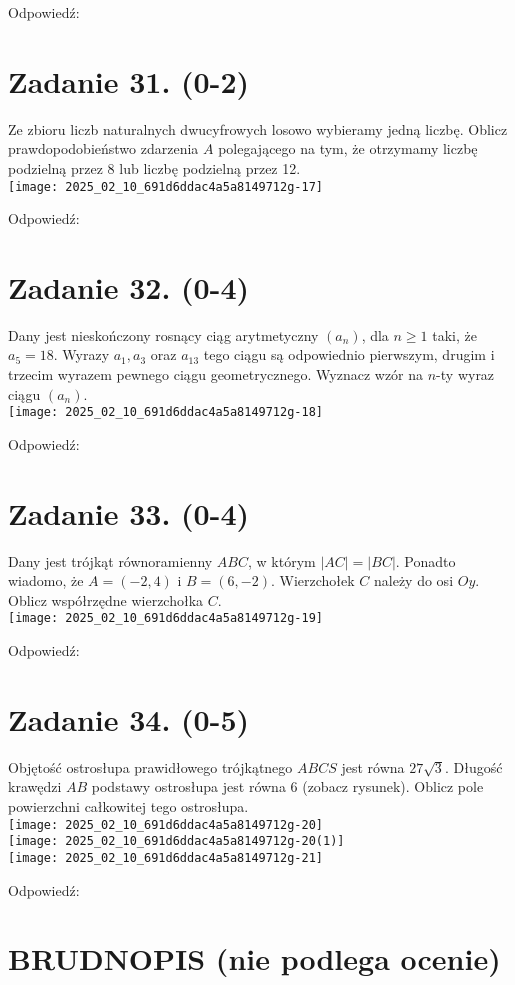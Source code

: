 \documentclass[10pt]{article}
\begin{document}
Odpowiedź:

\section*{Zadanie 31. (0-2)}
Ze zbioru liczb naturalnych dwucyfrowych losowo wybieramy jedną liczbę. Oblicz prawdopodobieństwo zdarzenia \(A\) polegającego na tym, że otrzymamy liczbę podzielną przez 8 lub liczbę podzielną przez 12.\\
\texttt{[image: 2025\_02\_10\_691d6ddac4a5a8149712g-17]}

Odpowiedź: \(\qquad\)

\section*{Zadanie 32. (0-4)}
Dany jest nieskończony rosnący ciąg arytmetyczny \(\left(a_{n}\right)\), dla \(n \geq 1\) taki, że \(a_{5}=18\). Wyrazy \(a_{1}, a_{3}\) oraz \(a_{13}\) tego ciągu są odpowiednio pierwszym, drugim i trzecim wyrazem pewnego ciągu geometrycznego. Wyznacz wzór na \(n\)-ty wyraz ciągu \(\left(a_{n}\right)\).\\
\texttt{[image: 2025\_02\_10\_691d6ddac4a5a8149712g-18]}

Odpowiedź: \(\qquad\)

\section*{Zadanie 33. (0-4)}
Dany jest trójkąt równoramienny \(A B C\), w którym \(|A C|=|B C|\). Ponadto wiadomo, że \(A=(-2,4)\) i \(B=(6,-2)\). Wierzchołek \(C\) należy do osi \(O y\). Oblicz współrzędne wierzchołka \(C\).\\
\texttt{[image: 2025\_02\_10\_691d6ddac4a5a8149712g-19]}

Odpowiedź:

\section*{Zadanie 34. (0-5)}
Objętość ostrosłupa prawidłowego trójkątnego \(A B C S\) jest równa \(27 \sqrt{3}\). Długość krawędzi \(A B\) podstawy ostrosłupa jest równa 6 (zobacz rysunek). Oblicz pole powierzchni całkowitej tego ostrosłupa.\\
\texttt{[image: 2025\_02\_10\_691d6ddac4a5a8149712g-20]}\\
\texttt{[image: 2025\_02\_10\_691d6ddac4a5a8149712g-20(1)]}\\
\texttt{[image: 2025\_02\_10\_691d6ddac4a5a8149712g-21]}

Odpowiedź:

\section*{BRUDNOPIS (nie podlega ocenie)}
\end{document}
